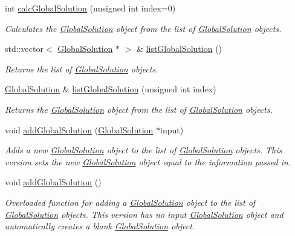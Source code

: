 \begin{DoxyCompactItemize}
int \hyperlink{classosea_1_1ofreq_1_1_outputs_body_a0d970726f3d24a2014f3f872852e9c6f}{calc\-Global\-Solution} (unsigned int index=0)
\begin{DoxyCompactList}\small\item\em Calculates the \hyperlink{classosea_1_1ofreq_1_1_global_solution}{Global\-Solution} object from the list of \hyperlink{classosea_1_1ofreq_1_1_global_solution}{Global\-Solution} objects. \end{DoxyCompactList}\item 
std\-::vector$<$ \hyperlink{classosea_1_1ofreq_1_1_global_solution}{Global\-Solution} $\ast$ $>$ \& \hyperlink{classosea_1_1ofreq_1_1_outputs_body_aef867ab4e6884f0dad8fcc8d57a18cdb}{list\-Global\-Solution} ()
\begin{DoxyCompactList}\small\item\em Returns the list of \hyperlink{classosea_1_1ofreq_1_1_global_solution}{Global\-Solution} objects. \end{DoxyCompactList}\item 
\hyperlink{classosea_1_1ofreq_1_1_global_solution}{Global\-Solution} \& \hyperlink{classosea_1_1ofreq_1_1_outputs_body_a8f79408b1a84cc54f52743514b88b659}{list\-Global\-Solution} (unsigned int index)
\begin{DoxyCompactList}\small\item\em Returns the \hyperlink{classosea_1_1ofreq_1_1_global_solution}{Global\-Solution} object from the list of \hyperlink{classosea_1_1ofreq_1_1_global_solution}{Global\-Solution} objects. \end{DoxyCompactList}\item 
void \hyperlink{classosea_1_1ofreq_1_1_outputs_body_ac5657a2f9a4ac48a56db7b081864ea8d}{add\-Global\-Solution} (\hyperlink{classosea_1_1ofreq_1_1_global_solution}{Global\-Solution} $\ast$input)
\begin{DoxyCompactList}\small\item\em Adds a new \hyperlink{classosea_1_1ofreq_1_1_global_solution}{Global\-Solution} object to the list of \hyperlink{classosea_1_1ofreq_1_1_global_solution}{Global\-Solution} objects. This version sets the new \hyperlink{classosea_1_1ofreq_1_1_global_solution}{Global\-Solution} object equal to the information passed in. \end{DoxyCompactList}\item 
void \hyperlink{classosea_1_1ofreq_1_1_outputs_body_a13ae87153fcf43774b970aad94f0ca27}{add\-Global\-Solution} ()
\begin{DoxyCompactList}\small\item\em Overloaded function for adding a \hyperlink{classosea_1_1ofreq_1_1_global_solution}{Global\-Solution} object to the list of \hyperlink{classosea_1_1ofreq_1_1_global_solution}{Global\-Solution} objects. This version has no input \hyperlink{classosea_1_1ofreq_1_1_global_solution}{Global\-Solution} object and automatically creates a blank \hyperlink{classosea_1_1ofreq_1_1_global_solution}{Global\-Solution} object. \end{DoxyCompactList}\end{DoxyCompactItemize}
